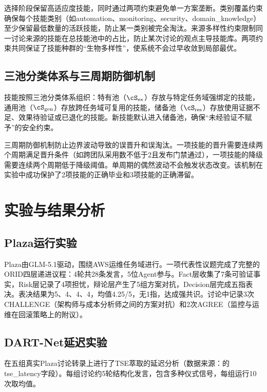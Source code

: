 \documentclass[12pt,a4paper]{ctexart}
\begin{document}
选择阶段保留高适应度技能，同时通过两项约束避免单一方案垄断。类别覆盖约束确保每个技能类别（如automation、monitoring、security、domain\_knowledge）至少保留最低数量的活跃技能，防止某一类别被完全淘汰。来源多样性约束限制同一讨论来源的技能在总技能池中的占比，防止某次讨论的观点主导技能库。两项约束共同保证了技能种群的“生物多样性”，使系统不会过早收敛到局部最优。

\subsection{三池分类体系与三周期防御机制}

技能按照三池分类体系组织：特有池（$\cS_{\text{ex}}$）存放与特定任务域强绑定的技能，通用池（$\cS_{\text{gen}}$）存放跨任务域可复用的技能，储备池（$\cS_{\text{res}}$）存放使用证据不足、效果待验证或已退化的技能。新技能默认进入储备池，确保“未经验证不赋予”的安全约束。

三周期防御机制防止边界波动导致的误晋升和误淘汰。一项技能的晋升需要连续两个周期满足晋升条件（如跨团队采用数不低于2且发布门禁通过），一项技能的降级需要连续两个周期低于降级阈值。单周期的偶然波动不会触发状态改变。该机制在实验中成功保护了2项技能的正确毕业和3项技能的正确滞留。

\section{实验与结果分析}

\subsection{Plaza运行实验}

Plaza由GLM-5.1驱动，围绕AWS运维任务域进行。一项代表性议题完成了完整的ORID四层递进议程：4轮共28条发言，5位Agent参与。Fact层收集了7条可验证事实，Risk层记录了4项担忧，辩论层产生了5组方案对抗，Decision层完成五指表决。表决结果为5、4、4、4，均值4.25/5，无1指，达成强共识。讨论中记录3次CHALLENGE（架构师与成本分析师之间的方案对抗）和2次AGREE（监控与运维在回滚策略上的附议）。

\subsection{DART-Net延迟实验}

在五组真实Plaza讨论转录上进行了TSE萃取的延迟分析（数据来源：的tse\_latency字段）。每组讨论约5轮结构化发言，包含多种仪式信号，每组运行10次取均值。
\end{document}
